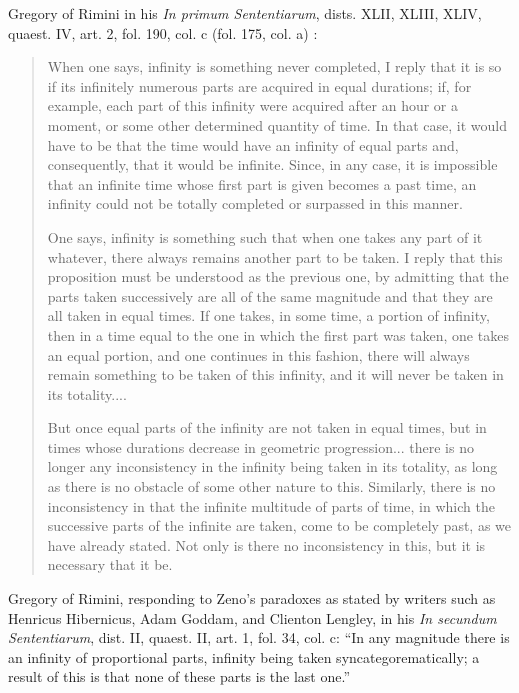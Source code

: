 \documentclass{article}
\begin{document}
Gregory of Rimini in his {\em In primum Sententiarum}, dists. XLII, XLIII, XLIV, quaest. IV, art. 2, fol. 190, col. c (fol. 175, col. a) \cite[pp.~115--116]{ariew}:
\begin{quote}
When one says, infinity is something never completed, I reply that it is so if its infinitely numerous parts are acquired in equal durations; if, for example, each part of this
infinity were acquired after an hour or a moment, or some other determined quantity of time. In that case, it would have to be that the time would have an infinity of equal parts and,
consequently, that it would be infinite. Since, in any case, it is impossible that an infinite time whose first part is given becomes a past time, an infinity could
not be totally completed or surpassed in this manner.

One says, infinity is something such that when one takes any part of it whatever, there always remains another part to be taken. I reply that this proposition
must be understood as the previous one, by admitting that the parts taken successively are all of the same magnitude and that they are all taken in equal times. If one takes, in some time, a portion of infinity, then in a time equal to the one in which the first part was taken, one takes an equal portion, and one continues in this fashion, there will always remain something
to be taken of this infinity, and it will never be taken in its totality....

But once equal parts of the infinity are not taken in equal times, but in times whose durations decrease in geometric progression... there is no longer any inconsistency in the
infinity being taken in its totality, as long as there is no obstacle of some other nature to this. Similarly, there is no inconsistency in that the infinite multitude of parts of time, in which
the successive parts of the infinite are taken, come to be completely past, as we have already stated. Not only is there no inconsistency in this, but it is necessary that it be.
\end{quote}

Gregory of Rimini, responding to Zeno's paradoxes as stated by writers such as Henricus Hibernicus, Adam Goddam, and Clienton Lengley, in his
{\em In secundum Sententiarum}, dist. II, quaest. II, art. 1, fol. 34, col. c:\cite[p.~57]{ariew} ``In any magnitude there is an infinity of proportional parts, infinity
being taken syncategorematically; a result of this is that none of these parts is the last one.''
\end{document}
